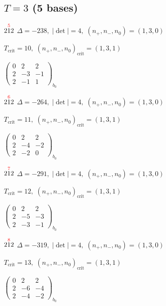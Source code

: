 \documentclass[10pt]{article}
\begin{document}
\newpage

\subsection*{$T = 3$ \quad (5 bases)}
\smallskip

$2\overset{\textcolor{red}{5}}{1}2$ \quad $\Delta=-238,\; |\det|=4,\; (n_+,n_-,n_0)=(1,3,0)$

\hspace{1em}$T_{\text{crit}}=10,\; (n_+,n_-,n_0)_{\text{crit}}=(1,3,1)$

\hspace{2em}$\left(\begin{smallmatrix}0 & 2 & 2 \\ 2 & -3 & -1 \\ 2 & -1 & 1\end{smallmatrix}\right)_{\!b_0}$

$2\overset{\textcolor{red}{6}}{1}2$ \quad $\Delta=-264,\; |\det|=4,\; (n_+,n_-,n_0)=(1,3,0)$

\hspace{1em}$T_{\text{crit}}=11,\; (n_+,n_-,n_0)_{\text{crit}}=(1,3,1)$

\hspace{2em}$\left(\begin{smallmatrix}0 & 2 & 2 \\ 2 & -4 & -2 \\ 2 & -2 & 0\end{smallmatrix}\right)_{\!b_0}$

$2\overset{\textcolor{red}{7}}{1}2$ \quad $\Delta=-291,\; |\det|=4,\; (n_+,n_-,n_0)=(1,3,0)$

\hspace{1em}$T_{\text{crit}}=12,\; (n_+,n_-,n_0)_{\text{crit}}=(1,3,1)$

\hspace{2em}$\left(\begin{smallmatrix}0 & 2 & 2 \\ 2 & -5 & -3 \\ 2 & -3 & -1\end{smallmatrix}\right)_{\!b_0}$

$2\overset{\textcolor{red}{8}}{1}2$ \quad $\Delta=-319,\; |\det|=4,\; (n_+,n_-,n_0)=(1,3,0)$

\hspace{1em}$T_{\text{crit}}=13,\; (n_+,n_-,n_0)_{\text{crit}}=(1,3,1)$

\hspace{2em}$\left(\begin{smallmatrix}0 & 2 & 2 \\ 2 & -6 & -4 \\ 2 & -4 & -2\end{smallmatrix}\right)_{\!b_0}$
\end{document}
